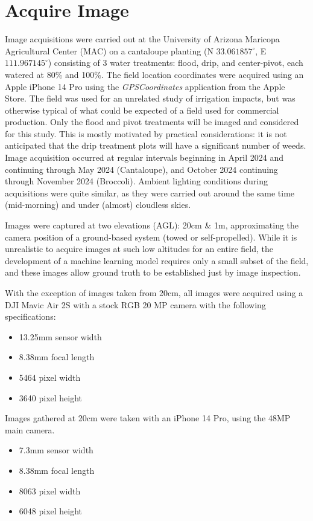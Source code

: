 \documentclass[letterpaper]{report}
\begin{document}
\section{Acquire Image}
Image acquisitions were carried out at the University of Arizona Maricopa Agricultural Center (\gls{MAC}) on a cantaloupe planting (N $33.061857^\circ$, E $111.967145^\circ$) consisting of 3 water treatments: flood, drip, and center-pivot, each watered at 80\% and 100\%. The field location coordinates were acquired using an Apple iPhone 14 Pro using the \textit{GPSCoordinates} application from the Apple Store. The field was used for an unrelated study of irrigation impacts, but was otherwise typical of what could be expected of a field used for commercial production.
Only the flood and pivot treatments will be imaged and considered for this study. This is mostly motivated by practical considerations: it is not anticipated that the drip treatment plots will have a significant number of weeds.  Image acquisition occurred at regular intervals beginning in April 2024 and continuing through May 2024 (Cantaloupe), and October 2024 continuing through November 2024 (Broccoli).  Ambient lighting conditions during acquisitions were quite similar, as they were carried out around the same time (mid-morning) and under (almost) cloudless skies.

Images were captured at two elevations (\gls{AGL}): 20cm \& 1m, approximating the camera position of a ground-based system (towed or self-propelled). While it is unrealistic to acquire images at such low altitudes for an entire field, the development of a machine learning model requires only a small subset of the field, and these images allow ground truth to be established just by image inspection. 

With the exception of images taken from 20cm, all images were acquired using a DJI Mavic Air 2S with a stock RGB 20 MP camera with the following specifications:

\begin{itemize}
	\item{13.25mm sensor width}
	\item{8.38mm focal length}
	\item{5464 pixel width}
	\item{3640 pixel height}
\end{itemize}

Images gathered at 20cm were taken with an iPhone 14 Pro, using the 48MP main camera.

\begin{itemize}
	\item{7.3mm sensor width}
	\item{8.38mm focal length}
	\item{8063 pixel width}
	\item{6048 pixel height}
\end{itemize}
\end{document}

